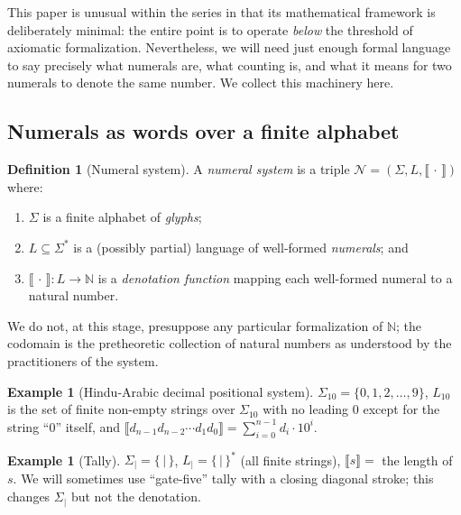 \documentclass[12pt]{article}
\theoremstyle{definition}
\newtheorem{definition}[theorem]{Definition}
\newtheorem{example}[theorem]{Example}
\theoremstyle{remark}
\begin{document}
This paper is unusual within the series in that its mathematical framework
is deliberately minimal: the entire point is to operate \emph{below} the
threshold of axiomatic formalization. Nevertheless, we will need just enough
formal language to say precisely what numerals are, what counting is, and
what it means for two numerals to denote the same number. We collect this
machinery here.

\subsection{Numerals as words over a finite alphabet}

\begin{definition}[Numeral system]
\label{def:numeral-system}
A \emph{numeral system} is a triple $\mathcal{N} = (\Sigma, L, \llbracket\,
\cdot\, \rrbracket)$ where:
\begin{enumerate}
\item $\Sigma$ is a finite alphabet of \emph{glyphs};
\item $L \subseteq \Sigma^*$ is a (possibly partial) language of well-formed
\emph{numerals}; and
\item $\llbracket\, \cdot\, \rrbracket : L \to \mathbb{N}$ is a
\emph{denotation function} mapping each well-formed numeral to a natural
number.
\end{enumerate}
We do not, at this stage, presuppose any particular formalization of
$\mathbb{N}$; the codomain is the pretheoretic collection of natural
numbers as understood by the practitioners of the system.
\end{definition}

\begin{example}[Hindu-Arabic decimal positional system]
\label{ex:hindu-arabic}
$\Sigma_{10} = \{0, 1, 2, \ldots, 9\}$, $L_{10}$ is the set of finite
non-empty strings over $\Sigma_{10}$ with no leading $0$ except for the
string ``$0$'' itself, and
$\llbracket d_{n-1} d_{n-2} \cdots d_1 d_0 \rrbracket = \sum_{i=0}^{n-1}
d_i \cdot 10^i$.
\end{example}

\begin{example}[Tally]
\label{ex:tally}
$\Sigma_{|} = \{\,|\,\}$, $L_{|} = \{\,|\,\}^*$ (all finite strings),
$\llbracket s \rrbracket = $ the length of $s$. We will sometimes use
``gate-five'' tally with a closing diagonal stroke; this changes
$\Sigma_{|}$ but not the denotation.
\end{example}
\end{document}
